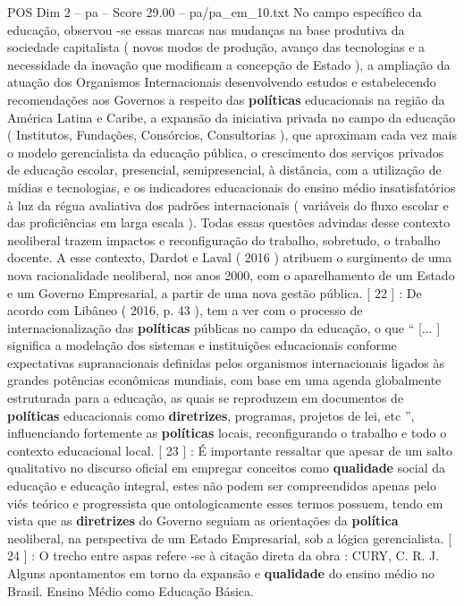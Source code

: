 \begin{textsample}{POS Dim 2 – pa – Score 29.00 – pa/pa\_em\_10.txt}
No campo específico da educação, observou -se essas marcas nas mudanças na base produtiva da sociedade capitalista ( novos modos de produção, avanço das tecnologias e a necessidade da inovação que modificam a concepção de Estado ), a ampliação da atuação dos Organismos Internacionais desenvolvendo estudos e estabelecendo recomendações aos Governos a respeito das \textbf{políticas} educacionais na região da América Latina e Caribe, a expansão da iniciativa privada no campo da educação ( Institutos, Fundações, Consórcios, Consultorias ), que aproximam cada vez mais o modelo gerencialista da educação pública, o crescimento dos serviços privados de educação escolar, presencial, semipresencial, à distância, com a utilização de mídias e tecnologias, e os indicadores educacionais do ensino médio insatisfatórios à luz da régua avaliativa dos padrões internacionais ( variáveis do fluxo escolar e das proficiências em larga escala ).
Todas essas questões advindas desse contexto neoliberal trazem impactos e reconfiguração do trabalho, sobretudo, o trabalho docente.
A esse contexto, Dardot e Laval ( 2016 ) atribuem o surgimento de uma nova racionalidade neoliberal, nos anos 2000, com o aparelhamento de um Estado e um Governo Empresarial, a partir de uma nova gestão pública. [ 22 ] : De acordo com Libâneo ( 2016, p. 43 ), tem a ver com o processo de internacionalização das \textbf{políticas} públicas no campo da educação, o que “ [... ] significa a modelação dos sistemas e instituições educacionais conforme expectativas supranacionais definidas pelos organismos internacionais ligados às grandes potências econômicas mundiais, com base em uma agenda globalmente estruturada para a educação, as quais se reproduzem em documentos de \textbf{políticas} educacionais como \textbf{diretrizes}, programas, projetos de lei, etc ”, influenciando fortemente as \textbf{políticas} locais, reconfigurando o trabalho e todo o contexto educacional local. [ 23 ] : É importante ressaltar que apesar de um salto qualitativo no discurso oficial em empregar conceitos como \textbf{qualidade} social da educação e educação integral, estes não podem ser compreendidos apenas pelo viés teórico e progressista que ontologicamente esses termos possuem, tendo em vista que as \textbf{diretrizes} do Governo seguiam as orientações da \textbf{política} neoliberal, na perspectiva de um Estado Empresarial, sob a lógica gerencialista. [ 24 ] : O trecho entre aspas refere -se à citação direta da obra : CURY, C.
R.
J.
Alguns apontamentos em torno da expansão e \textbf{qualidade} do ensino médio no Brasil.
Ensino Médio como Educação Básica.

\end{textsample}
